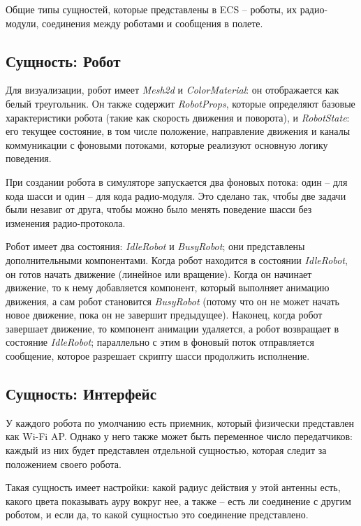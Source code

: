 \documentclass[%
]{article}
\begin{document}
Общие типы сущностей, которые представлены в ECS -- 
роботы, их радио-модули,
соединения между роботами
и сообщения в полете.

\subsection{Сущность: Робот}

Для визуализации, робот имеет \emph{Mesh2d} и \emph{ColorMaterial}:
он отображается как белый треугольник.
Он также содержит \emph{RobotProps},
которые определяют базовые характеристики робота
(такие как скорость движения и поворота),
и \emph{RobotState}: 
его текущее состояние, в том числе
положение, направление движения
и каналы коммуникации с фоновыми потоками,
которые реализуют основную логику поведения.

При создании робота в симуляторе запускается два фоновых потока:
один -- для кода шасси
и один -- для кода радио-модуля.
Это сделано так, чтобы две задачи были незавиг от друга,
чтобы можно было менять поведение шасси без изменения радио-протокола.

Робот имеет два состояния: \emph{IdleRobot} и \emph{BusyRobot};
они представлены дополнительными компонентами.
Когда робот находится в состоянии \emph{IdleRobot},
он готов начать движение
(линейное или вращение).
Когда он начинает движение,
то к нему добавляется компонент,
который выполняет анимацию движения,
а сам робот становится \emph{BusyRobot}
(потому что он не может начать новое движение,
пока он не завершит предыдущее).
Наконец, когда робот завершает движение,
то компонент анимации удаляется,
а робот возвращает в состояние \emph{IdleRobot};
параллельно с этим
в фоновый поток отправляется сообщение,
которое разрешает скрипту шасси продолжить исполнение.

\subsection{Сущность: Интерфейс}

У каждого робота по умолчанию есть приемник,
который физически представлен как Wi-Fi AP.
Однако у него также может быть переменное число передатчиков:
каждый из них будет представлен отдельной сущностью,
которая следит за положением своего робота.

Такая сущность имеет настройки:
какой радиус действия у этой антенны есть,
какого цвета показывать ауру вокруг нее,
а также -- есть ли соединение с другим роботом,
и если да, то какой сущностью это соединение представлено.
\end{document}
